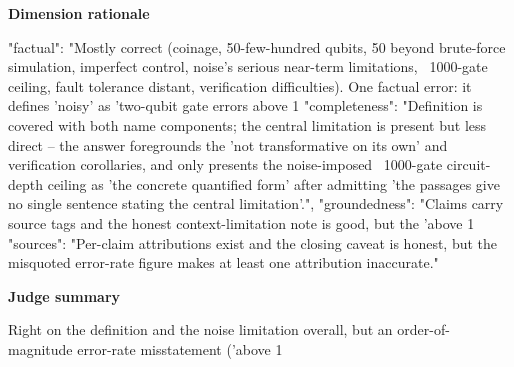 \documentclass[10pt]{article}
\begin{document}
\textbf{Dimension rationale}
\begin{EvidenceText}
{
  "factual": "Mostly correct (coinage, 50-few-hundred qubits, 50 beyond brute-force simulation, imperfect control, noise's serious near-term limitations, ~1000-gate ceiling, fault tolerance distant, verification difficulties). One factual error: it defines 'noisy' as 'two-qubit gate errors above 1%
  "completeness": "Definition is covered with both name components; the central limitation is present but less direct -- the answer foregrounds the 'not transformative on its own' and verification corollaries, and only presents the noise-imposed ~1000-gate circuit-depth ceiling as 'the concrete quantified form' after admitting 'the passages give no single sentence stating the central limitation'.",
  "groundedness": "Claims carry source tags and the honest context-limitation note is good, but the 'above 1%
  "sources": "Per-claim attributions exist and the closing caveat is honest, but the misquoted error-rate figure makes at least one attribution inaccurate."
}
\end{EvidenceText}

\textbf{Judge summary}
\begin{EvidenceText}
Right on the definition and the noise limitation overall, but an order-of-magnitude error-rate misstatement ('above 1%
\end{EvidenceText}
\end{document}
